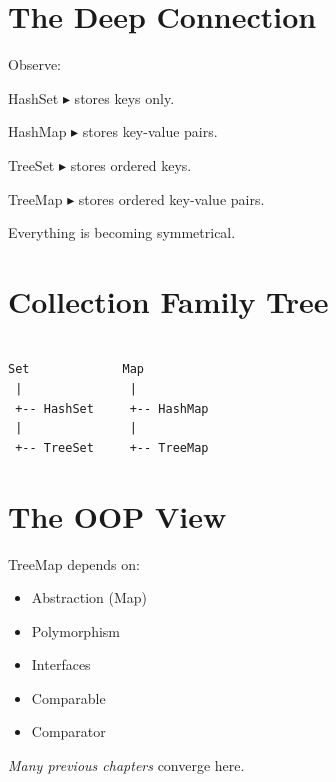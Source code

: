 \documentclass[11pt,a4paper]{book}
\begin{document}

\section{The Deep Connection}

Observe:

HashSet $\blacktriangleright$ stores keys only.

HashMap $\blacktriangleright$ stores key-value pairs.

TreeSet $\blacktriangleright$ stores ordered keys.

TreeMap $\blacktriangleright$ stores ordered key-value pairs.

Everything is becoming symmetrical.

\section{Collection Family Tree}

\begin{verbatim}

Set             Map
 |               |   
 +-- HashSet     +-- HashMap
 |               |
 +-- TreeSet     +-- TreeMap

\end{verbatim}


\section{The OOP View}

TreeMap depends on:
\begin{itemize}
\item \textcolor{RosettaBlue}{Abstraction}
(Map)

\item \textcolor{RosettaDeepGreen}{Polymorphism}

\item \textcolor{RosettaRoyalPurple}{Interfaces}

\item \textcolor{RosettaJade}{Comparable}

\item \textcolor{RosettaJade}{Comparator}
\end{itemize}
\emph{Many previous chapters} converge here.
\end{document}
